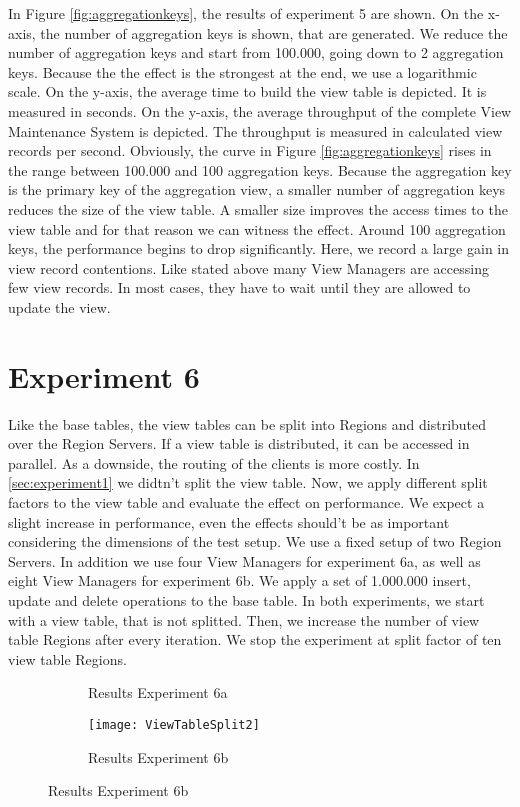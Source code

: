 \documentclass[11pt,a4paper,bibtotoc,idxtotoc,headsepline,footsepline,footexclude,BCOR12mm,DIV13]{scrbook}
\begin{document}
In Figure \ref{fig:aggregationkeys}, the results of experiment 5 are shown. On the x-axis, the number of aggregation keys is shown, that are generated. We reduce the number of aggregation keys and start from 100.000, going down to 2 aggregation keys. Because the the effect is the strongest at the end, we use a logarithmic scale. On the y-axis, the average time to build the view table is depicted. It is measured in seconds. On the y-axis, the average throughput of the complete View Maintenance System is depicted. The throughput is measured in calculated view records per second. Obviously, the curve in Figure \ref{fig:aggregationkeys} rises in the range between 100.000 and 100 aggregation keys. Because the aggregation key is the primary key of the aggregation view, a smaller number of aggregation keys reduces the size of the view table. A smaller size improves the access times to the view table and for that reason we can witness the effect. Around 100 aggregation keys, the performance begins to drop significantly. Here, we record a large gain in view record contentions. Like stated above many View Managers are accessing few view records. In most cases, they have to wait until they are allowed to update the view. 

\section{Experiment 6}
\label{sec:experiment6}

Like the base tables, the view tables can be split into Regions and distributed over the Region Servers. If a view table is distributed, it can be accessed in parallel. As a downside, the routing of the clients is more costly. In \ref{sec:experiment1} we didtn't split the view table. Now, we apply different split factors to the view table and evaluate the effect on performance. We expect a slight increase in performance, even the effects should't be as important considering the dimensions of the test setup. We use a fixed setup of two Region Servers. In addition we use four View Managers for experiment 6a, as well as eight View Managers for experiment 6b. We apply a set of 1.000.000 insert, update and delete operations to the base table. In both experiments, we start with a view table, that is not splitted. Then, we increase the number of view table Regions after every iteration. We stop the experiment at split factor of ten view table Regions.

\begin{figure}[h!]
        \centering        
		\begin{subfigure}{0.49\textwidth}  
    		\caption{Results Experiment 6a}
    		\label{fig:viewtablesplit}
		\end{subfigure}
		\begin{subfigure}{0.49\textwidth}   
    		\texttt{[image: ViewTableSplit2]}
    		\caption{Results Experiment 6b}
    		\label{fig:viewtablesplit2}
		\end{subfigure}		
\end{figure}
\end{document}
